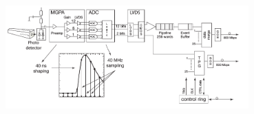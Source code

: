\begin{center}
\centering
\mbox{\includegraphics[height=0.5\textwidth, width=0.7\textwidth]{THESISPLOTS/ReadOut.png}} 
\label{fig:readout}
\end{center}

